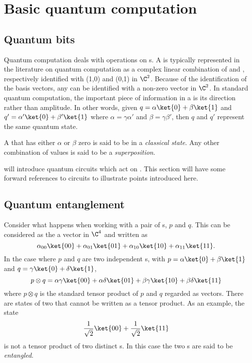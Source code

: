 
\section{Basic quantum computation} %
\label{sec:basic_quantum_computation}

\subsection{Quantum bits} %
\label{sub:quantum_bits}

Quantum computation deals with operations on \qubit{}s. A \qubit{} is typically represented in the
literature on quantum computation as a complex linear combination of  and ,
respectively identified with (1,0) and (0,1) in $\C^2$. Because of the identification of the basis
vectors, any \qubit{} can be identified with a non-zero vector in $\C^2$. In standard quantum
computation, the important piece of information in a \qubit{} is its direction rather than
amplitude. In other words, given $q=\alpha\ket{0}+\beta\ket{1}$ and
$q'=\alpha'\ket{0}+\beta'\ket{1}$ where $\alpha = \gamma\alpha'$ and $\beta = \gamma\beta'$, then
$q$ and $q'$ represent the same quantum state.

A \qubit{} that has either $\alpha$ or $\beta$ zero is said to be in a \emph{classical state}. Any
other combination of values is said to be a \emph{superposition}.

 will introduce quantum circuits which act on \qubits{}. This section
will have some forward references to circuits to illustrate points introduced here.


\subsection{Quantum entanglement} %
\label{sub:quantum_entanglement}

Consider what happens when working with a pair of \qubit{}s, $p$ and $q$. This can be considered as
the a vector in $\C^4$ and written as
\begin{equation}
  \alpha_{00}\ket{00}+\alpha_{01}\ket{01}+\alpha_{10}\ket{10}+
  \alpha_{11}\ket{11}.\label{eq:appTwoqubits}
\end{equation}
In the case where $p$ and $q$ are two independent \qubit{}s, with $p=\alpha\ket{0}+\beta\ket{1}$
and $q=\gamma\ket{0}+\delta\ket{1}$,
\begin{equation}
  p \otimes q = \alpha\gamma\ket{00}+\alpha\delta\ket{01}+\beta\gamma\ket{10}+\beta\delta\ket{11}
\end{equation}
where $p \otimes q$ is the standard tensor product of $p$ and $q$ regarded as vectors. There are
states of two \qubits{} that cannot be written as a tensor product. As an example, the state
\begin{equation}
  \frac{1}{\sqrt{2}}\ket{00} + \frac{1}{\sqrt{2}}\ket{11}\label{eq:appEntangledqubits}
\end{equation}
is not a tensor product of two distinct \qubit{}s. In this case the two \qubit{}s are said to be
\emph{entangled}.

